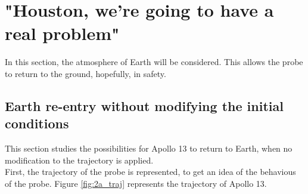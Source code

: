 \documentclass[a4paper,12pt,twoside]{article}
\begin{document}

\section{"Houston, we're going to have a real problem"}
In this section, the atmosphere of Earth will be considered.
This allows the probe to return to the ground, hopefully, in safety.

\subsection{Earth re-entry without modifying the initial conditions}
This section studies the possibilities for Apollo 13 to return to Earth, when no modification to the trajectory is applied.\\

First, the trajectory of the probe is represented, to get an idea of the behavious of the probe.
Figure \ref{fig:2a_traj} represents the trajectory of Apollo 13.
\end{document}
